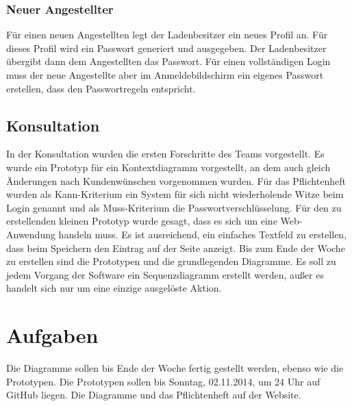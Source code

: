 \documentclass{scrartcl}
\begin{document}
\subsubsection{Neuer Angestellter}
Für einen neuen Angestellten legt der Ladenbesitzer ein neues Profil an. Für dieses Profil wird ein Passwort generiert und ausgegeben. Der Ladenbesitzer übergibt dann dem Angestellten das Passwort. Für einen vollständigen Login muss der neue Angestellte aber im Anmeldebildschirm ein eigenes Passwort erstellen, dass den Passwortregeln entspricht.
\subsection{Konsultation}
In der Konsultation wurden die ersten Forschritte des Teams vorgestellt. Es wurde ein Prototyp für ein Kontextdiagramm
vorgestellt, an dem auch gleich Änderungen nach Kundenwünschen vorgenommen wurden. 
Für das Pflichtenheft wurden 
als Kann-Kriterium ein System für sich nicht wiederholende Witze beim Login genannt und als Muss-Kriterium die
Passwortverschlüsselung. 
Für den zu erstellenden kleinen Prototyp wurde gesagt, dass es sich um eine Web-Anwendung
handeln muss. Es ist ausreichend, ein einfaches Textfeld zu erstellen, dass beim Speichern den Eintrag auf der
Seite anzeigt.
Bis zum Ende der Woche zu erstellen sind die Prototypen und die grundlegenden Diagramme. Es soll zu jedem Vorgang
der Software ein Sequenzdiagramm erstellt werden, außer es handelt sich nur um eine einzige ausgelöste Aktion.

\vspace*{1em}

\section{Aufgaben}
Die Diagramme sollen bis Ende der Woche fertig gestellt werden, ebenso wie die Prototypen. Die Prototypen sollen bis Sonntag, 02.11.2014, um 24 Uhr auf GitHub liegen. Die Diagramme und das Pflichtenheft auf der Website.
\end{document}
